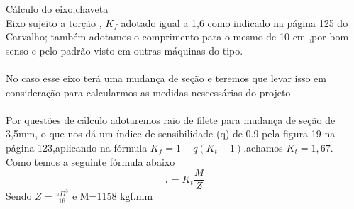 \documentclass[100pt]{article}
\begin{document}
C\'alculo do eixo,chaveta\\

Eixo sujeito a tor\c{c}\~ao , $K_f$ adotado igual a 1,6 como indicado na p\'agina 125 do Carvalho; tamb\'em adotamos o comprimento para o mesmo de 10 cm ,por bom senso e pelo padr\~ao visto em outras m\'aquinas do tipo.\\\\

No caso esse eixo ter\'a uma mudan\c{c}a de se\c{c}\~ao e teremos que levar isso em considera\c{c}\~ao para calcularmos as medidas nescess\'arias do projeto\\
\\
 Por quest\~oes de c\'alculo adotaremos raio de filete para mudan\c{c}a de se\c{c}\~ao de 3,5mm, o que nos d\'a um \'indice de sensibilidade (q) de 0.9 pela figura 19 na p\'agina 123,aplicando na f\'ormula $K_f=1+q(K_t-1)$,achamos $K_t=1,67$. \\
Como temos a seguinte f\'ormula abaixo\\
$$\tau =K_t \frac{M}{Z}$$
Sendo $Z=\frac{\pi D^3}{16}$ e M=1158 kgf.mm\\\\
\end{document}
